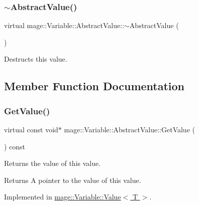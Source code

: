 \subsubsection{\texorpdfstring{$\sim$\+Abstract\+Value()}{~AbstractValue()}}
{\footnotesize\ttfamily virtual mage\+::\+Variable\+::\+Abstract\+Value\+::$\sim$\+Abstract\+Value (\begin{DoxyParamCaption}{ }\end{DoxyParamCaption})\hspace{0.3cm}{\ttfamily [virtual]}}

Destructs this value. 

\subsection{Member Function Documentation}
\hypertarget{structmage_1_1_variable_1_1_abstract_value_aede2a77b571b80794a4254e34144f4c1}{}\label{structmage_1_1_variable_1_1_abstract_value_aede2a77b571b80794a4254e34144f4c1} 
\subsubsection{\texorpdfstring{Get\+Value()}{GetValue()}}
{\footnotesize\ttfamily virtual const void$\ast$ mage\+::\+Variable\+::\+Abstract\+Value\+::\+Get\+Value (\begin{DoxyParamCaption}{ }\end{DoxyParamCaption}) const\hspace{0.3cm}{\ttfamily [pure virtual]}}

Returns the value of this value.

\begin{DoxyReturn}{Returns}
A pointer to the value of this value. 
\end{DoxyReturn}


Implemented in \hyperlink{structmage_1_1_variable_1_1_value_afd0b93364cba9a55182f126fdcc79b50}{mage\+::\+Variable\+::\+Value$<$ T $>$}.

